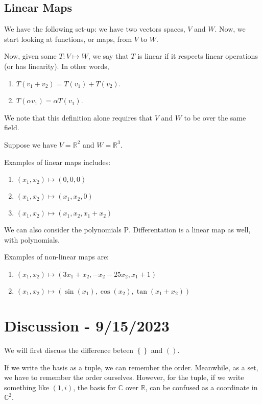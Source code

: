 \documentclass[openany]{book}
\newcommand{\CC}{\mathbb{C}}
\newcommand{\RR}{\mathbb{R}}
\begin{document}
\subsection{Linear Maps}
We have the following set-up: we have two vectors spaces, $V$ and $W$. Now, we start looking at functions, or maps, from $V$ to $W$.

Now, given some $T : V \mapsto W$, we say that $T$ is linear if it respects linear operations (or has linearity). In other words,
\begin{enumerate}
	\item $T(v_{1} + v_{2}) = T(v_{1}) + T(v_{2})$.
	\item $T(\alpha v_{1}) = \alpha T(v_{1})$.
\end{enumerate}

We note that this definition alone requires that $V$ and $W$ to be over the same field.

\begin{example}
	Suppose we have $V = \RR^{2}$ and $W = \RR^{3}$.
	
	Examples of linear maps includes:
	\begin{enumerate}
		\item $(x_{1}, x_{2}) \mapsto (0,0,0)$
		\item $(x_{1}, x_{2}) \mapsto (x_{1}, x_{2}, 0)$
		\item $(x_{1}, x_{2}) \mapsto (x_{1}, x_{2}, x_{1} + x_{2})$
	\end{enumerate} 

	We can also consider the polynomials $\mathrm{P}$. Differentation is a linear map as well, with polynomials.
\end{example}

\begin{example}
	Examples of non-linear maps are:
	\begin{enumerate}
		\item $(x_{1}, x_{2}) \mapsto (3x_{1} + x_{2}, -x_{2} - 25x_{2}, x_{1} + 1)$
		\item $(x_{1}, x_{2}) \mapsto (\sin (x_{1}), \cos (x_{2}), \tan (x_{1} + x_{2}))$
	\end{enumerate}
\end{example}

\section{Discussion - 9/15/2023}
\begin{rmk}
	We will first discuss the difference beteen $\left\{  \right\}$ and $\left(  \right)$.
	
	If we write the basis as a tuple, we can remember the order. Meanwhile, as a set, we have to remember the order ourselves. However, for the tuple, if we write something like $(1, i)$, the basis for $\CC$ over $\RR$, can be confused as a coordinate in $\CC^{2}$.
\end{rmk}
\end{document}
